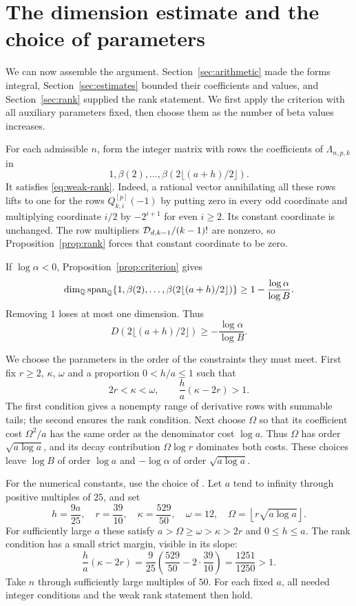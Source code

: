 \section{The dimension estimate and the choice of parameters}
\label{sec:conclusion}

We can now assemble the argument. Section~\ref{sec:arithmetic} made the
forms integral, Section~\ref{sec:estimates} bounded their coefficients
and values, and Section~\ref{sec:rank} supplied the rank statement.
We first apply the criterion with all auxiliary parameters fixed, then
choose them as the number of beta values increases.

For each admissible $n$, form the integer matrix with rows the coefficients
of $\Lambda_{n,p,k}$ in
\[
 1,\beta(2),\ldots,\beta(2\lfloor(a+h)/2\rfloor).
\]
It satisfies \eqref{eq:weak-rank}.
Indeed, a rational vector annihilating all these rows lifts to one for
the rows $Q_{k,i}^{[p]}(-1)$ by putting zero in every odd coordinate and
multiplying coordinate $i/2$ by $-2^{i+1}$ for even $i\geq2$.
Its constant coordinate is unchanged.
The row multipliers $\mathcal D_{d,k-1}/(k-1)!$ are nonzero, so
Proposition~\ref{prop:rank} forces that constant coordinate to be zero.

If $\log\alpha<0$, Proposition~\ref{prop:criterion} gives
\[
 \dim_\mathbb Q\operatorname{span}_\mathbb Q\{1,\beta(2),\ldots,
                      \beta(2\lfloor(a+h)/2\rfloor)\}
       \geq1-\frac{\log\alpha}{\log B}.
\]
Removing $1$ loses at most one dimension. Thus
\begin{equation}\label{eq:parameter-bound}
 D(2\lfloor(a+h)/2\rfloor)\geq-\frac{\log\alpha}{\log B}.
\end{equation}

We choose the parameters in the order of the constraints they must meet.
First fix $r\geq2$, $\kappa$, $\omega$ and a proportion $0<h/a\leq1$
such that
\[
 2r<\kappa<\omega,\qquad \frac{h}{a}(\kappa-2r)>1.
\]
The first condition gives a nonempty range of derivative rows with
summable tails; the second ensures the rank condition.
Next choose $\Omega$ so that its coefficient cost $\Omega^2/a$ has
the same order as the denominator cost $\log a$.
Thus $\Omega$ has order $\sqrt{a\log a}$, and its decay contribution
$\Omega\log r$ dominates both costs. These choices leave $\log B$
of order $\log a$ and $-\log\alpha$ of order $\sqrt{a\log a}$.

For the numerical constants, use the choice of \cite[Section~4.6]{F26}.
Let $a$ tend to infinity through positive multiples of $25$, and set
\begin{equation}\label{eq:parameters}
 h=\frac{9a}{25},\quad
 r=\frac{39}{10},\quad
 \kappa=\frac{529}{50},\quad
 \omega=12,\quad
 \Omega=\left\lfloor r\sqrt{a\log a}\right\rfloor.
\end{equation}
For sufficiently large $a$ these satisfy
$a>\Omega\geq\omega>\kappa>2r$ and $0\leq h\leq a$.
The rank condition has a small strict margin, visible in its slope:
\[
 \frac{h}{a}(\kappa-2r)
   =\frac9{25}\left(\frac{529}{50}-2\cdot\frac{39}{10}\right)
   =\frac{1251}{1250}>1.
\]
Take $n$ through sufficiently large multiples of $50$.
For each fixed $a$, all needed integer conditions and the weak rank
statement then hold.

